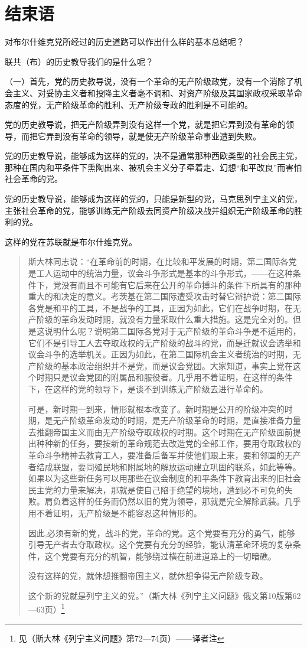\section{结束语}

对布尔什维克党所经过的历史道路可以作出什么样的基本总结呢？

联共（布）的历史教导我们的是什么呢？

（一）首先，党的历史教导说，没有一个革命的无产阶级政党，没有一个消除了机会主义、对妥协主义者和投降主义者毫不调和、对资产阶级及其国家政权采取革命态度的党，无产阶级革命的胜利、无产阶级专政的胜利是不可能的。

党的历史教导说，把无产阶级弄到没有这样一个党，就是把它弄到没有革命的领导，而把它弄到没有革命的领导，就是使无产阶级革命事业遭到失败。

党的历史教导说，能够成为这样的党的，决不是通常那种西欧类型的社会民主党，那种在国内和平条件下熏陶出来、被机会主义分子牵着走、幻想“和平改良”而害怕社会革命的党。

党的历史教导说，能够成为这样的党的，只能是新型的党，马克思列宁主义的党，主张社会革命的党，能够训练无产阶级去同资产阶级决战并组织无产阶级革命的胜利的党。

这样的党在苏联就是布尔什维克党。

\begin{quotation}
斯大林同志说：“在革命前的时期，在比较和平发展的时期，第二国际各党是工人运动中的统治力量，议会斗争形式是基本的斗争形式，——在这种条件下，党没有而且不可能有它后来在公开的革命搏斗的条件下所具有的那种重大的和决定的意义。考茨基在第二国际遭受攻击时替它辩护说：第二国际各党是和平的工具，不是战争的工具，正因为如此，它们在战争时期，在无产阶级的革命发动时期，就没有力量采取什么重大措施。这是完全对的。但是这说明什么呢？说明第二国际各党对于无产阶级的革命斗争是不适用的，它们不是引导工人去夺取政权的无产阶级的战斗的党，而是迁就议会选举和议会斗争的选举机关。正因为如此，在第二国际机会主义者统治的时期，无产阶级的基本政治组织并不是党，而是议会党团。大家知道，事实上党在这个时期只是议会党团的附属品和服役者。几乎用不着证明，在这样的条件下，在这样的党的领导下，是谈不到训练无产阶级去进行革命的。

可是，新时期一到来，情形就根本改变了。新时期是公开的阶级冲突的时期，是无产阶级革命发动的时期，是无产阶级革命的时期，是直接准备力量去推翻帝国主义而由无产阶级夺取政权的时期。这个时期在无产阶级面前提出种种新的任务，要按新的革命规范去改造党的全部工作，要用夺取政权的革命斗争精神去教育工人，要准备后备军并使他们跟上来，要和邻国的无产者结成联盟，要同殖民地和附属地的解放运动建立巩固的联系，如此等等。如果以为这些新任务可以用那些在议会制度的和平条件下教育出来的旧社会民主党的力量来解决，那就是使自己陷于绝望的境地，遭到必不可免的失败。肩负着这样的任务而仍然以旧的党为领导，那就是完全解除武装。几乎用不着证明，无产阶级是不能容忍这种情形的。

因此,必须有新的党，战斗的党，革命的党。这个党要有充分的勇气，能够引导无产者去夺取政权。这个党要有充分的经验，能认清革命环境的复杂条件，这个党要有充分的机智，能够绕过横在前进道路上的一切暗礁。

没有这样的党，就休想推翻帝国主义，就休想争得无产阶级专政。

这个新的党就是列宁主义的党。”（斯大林《列宁主义问题》俄文第10版第62—63页）\footnote{见（斯大林《列宁主义问题》第72—74页）——译者注}
\end{quotation}


